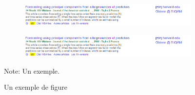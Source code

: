 \documentclass[12pt]{article}
\begin{document}
	\begin{figure}[H] %
		\begin{center}
			\begin{subfigure}{.5\textwidth} %
				\includegraphics[width=\textwidth]{../googleScholar.png}
			\end{subfigure}%
			\begin{subfigure}{.5\textwidth}
				\includegraphics[width=\textwidth]{../googleScholar.png}
			\end{subfigure}
			\caption{Un exemple de figure} \label{figure}
		\end{center}
		\begin{footnotesize}
			\flushleft
			Note: Un exemple.
		\end{footnotesize}
	\end{figure}
	
	
	\cite{cit1} %
	
	\clearpage                              %
	\renewcommand{\refname}{Bibliographie}  %
	
\end{document}
